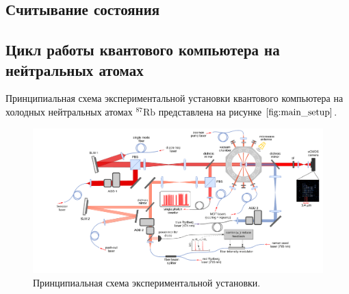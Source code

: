 \subsection{Считывание состояния}

\subsection{Цикл работы квантового компьютера на нейтральных атомах}

Принципиальная схема экспериментальной установки квантового компьютера на холодных нейтральных атомах $^{87}\text{Rb}$ представлена на рисунке $\ref{fig:main_setup}$.

\begin{figure}[ht]
	\centering
	\includegraphics[width=1.0\textwidth]{images/Main_setup_vs_Raman_EN.pdf}
	\caption{Принципиальная схема экспериментальной установки.}
	\label{fig:main_setup}
\end{figure}



\newpage